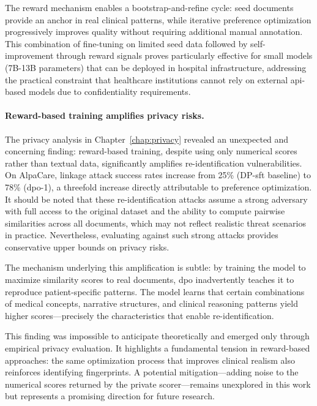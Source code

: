 The reward mechanism enables a bootstrap-and-refine cycle: seed documents provide an anchor in real clinical patterns, while iterative preference optimization progressively improves quality without requiring additional manual annotation.
This combination of fine-tuning on limited seed data followed by self-improvement through reward signals proves particularly effective for small models (7B-13B parameters) that can be deployed in hospital infrastructure, addressing the practical constraint that healthcare institutions cannot rely on external \gls{api}-based models due to confidentiality requirements.

\paragraph{Reward-based training amplifies privacy risks.}

The privacy analysis in Chapter~\ref{chap:privacy} revealed an unexpected and concerning finding: reward-based training, despite using only numerical scores rather than textual data, significantly amplifies re-identification vulnerabilities.
On AlpaCare, linkage attack success rates increase from 25\% (DP-\gls{sft} baseline) to 78\% (\gls{dpo}-1), a threefold increase directly attributable to preference optimization.
It should be noted that these re-identification attacks assume a strong adversary with full access to the original dataset and the ability to compute pairwise similarities across all documents, which may not reflect realistic threat scenarios in practice.
Nevertheless, evaluating against such strong attacks provides conservative upper bounds on privacy risks.

The mechanism underlying this amplification is subtle: by training the model to maximize similarity scores to real documents, \gls{dpo} inadvertently teaches it to reproduce patient-specific patterns.
The model learns that certain combinations of medical concepts, narrative structures, and clinical reasoning patterns yield higher scores—precisely the characteristics that enable re-identification.

This finding was impossible to anticipate theoretically and emerged only through empirical privacy evaluation.
It highlights a fundamental tension in reward-based approaches: the same optimization process that improves clinical realism also reinforces identifying fingerprints.
A potential mitigation—adding noise to the numerical scores returned by the private scorer—remains unexplored in this work but represents a promising direction for future research.

